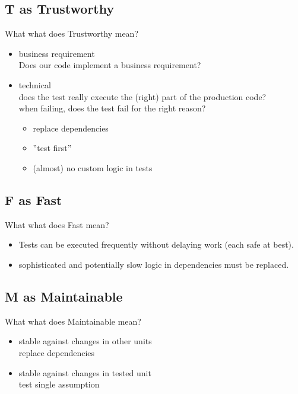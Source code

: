 \documentclass[SoftwareQuality.tex]{subfiles}
\begin{document}
\subsection*{T as Trustworthy}
\begin{frame}{What what does Trustworthy mean?} 
	\begin{itemize}
		\item   business requirement
			\\{\footnotesize
				Does our code implement a business requirement? 
			}
		\item   technical  	
			\\{\footnotesize 
				does the test really execute the (right) part of the production code?\\
				when failing, does the test fail for the right reason?
				}
			\begin{itemize}
				\item replace dependencies
				\item ''test first''
				\item (almost) no custom logic in tests
			\end{itemize}
	\end{itemize}
\end{frame}

\subsection*{F as Fast}
\begin{frame}{What what does Fast mean?} 
	\begin{itemize}
		\item  Tests can be executed frequently without delaying work (each safe at best).
		\item  sophisticated and potentially slow logic in dependencies must be replaced.
	\end{itemize}
\end{frame}

\subsection*{M as Maintainable}
\begin{frame}{What what does Maintainable mean?} 
	\begin{itemize}
		\item  stable against changes in other units
		\\{\footnotesize 
				replace dependencies
				}
		\item  stable against changes in tested unit
		\\{\footnotesize 
				test single assumption
				}
	\end{itemize}
\end{frame}
\end{document}
